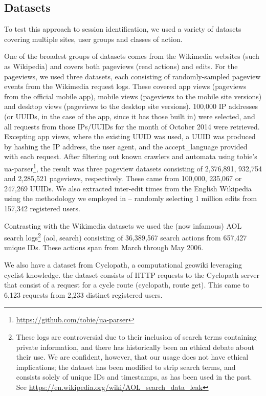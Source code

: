 \subsection{Datasets}
To test this approach to session identification, we used a variety of datasets covering multiple sites, user groups and classes of action.

 One of the broadest groups of datasets comes from the Wikimedia websites (such as Wikipedia) and covers both pageviews (read actions) and edits. For the pageviews, we used three datasets, each consisting of randomly-sampled pageview events from the Wikimedia request logs. These covered app views (pageviews from the official mobile app), mobile views (pageviews to the mobile site versions) and desktop views (pageviews to the desktop site versions). 100,000 IP addresses (or UUIDs, in the case of the app, since it has those built in) were selected, and all requests from those IPs/UUIDs for the month of October 2014 were retrieved. Excepting app views, where the existing UUID was used, a UUID was produced by hashing the IP address, the user agent, and the accept\_language provided with each request. After filtering out known crawlers and automata using tobie’s ua-parser\footnote{\url{https://github.com/tobie/ua-parser}}, the result was three pageview datasets consisting of 2,376,891, 932,754 and 2,285,521 pageviews, respectively. These came from 100,000, 235,067 or 247,269 UUIDs. We also extracted inter-edit times from the English Wikipedia using the methodology we employed in \cite{geiger2013using} -- randomly selecting 1 million edits from 157,342 registered users.

 Contrasting with the Wikimedia datasets we used the (now infamous) AOL search logs\footnote{These logs are controversial due to their inclusion of search terms containing private information, and there has historically been an ethical debate about their use. We are confident, however, that our usage does not have ethical implications; the dataset has been modified to strip search terms, and consists solely of unique IDs and timestamps, as has been used in the past.\cite{mehrzadi2012onextracting}  See \url{https://en.wikipedia.org/wiki/AOL_search_data_leak}} (aol, search) consisting of 36,389,567 search actions from 657,427 unique IDs. These actions span from March through May 2006.

 We also have a dataset from Cyclopath, a computational geowiki leveraging cyclist knowledge.\cite{priedhorsky2008computational} the dataset consists of HTTP requests to the Cyclopath server that consist of a request for a cycle route (cyclopath, route get). This came to 6,123 requests from 2,233 distinct registered users.

